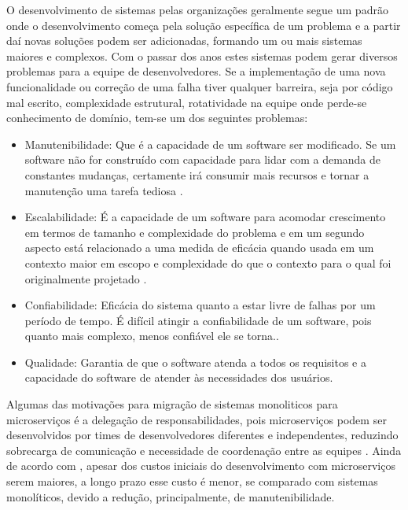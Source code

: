 \documentclass[12pt]{article}
\begin{document}
O desenvolvimento de sistemas pelas organizações geralmente segue um padrão onde o desenvolvimento começa pela solução específica de um problema e a partir daí novas soluções podem ser adicionadas, formando um ou mais sistemas maiores e complexos. Com o passar dos anos estes sistemas podem gerar diversos problemas para a equipe de desenvolvedores. Se a implementação de uma nova funcionalidade ou correção de uma falha tiver qualquer barreira, seja por código mal escrito, complexidade estrutural, rotatividade na equipe onde perde-se conhecimento de domínio, tem-se um dos seguintes problemas:
\begin{itemize}
	\item Manutenibilidade: Que é a capacidade de um software ser modificado. Se um software não for construído com capacidade para lidar com a demanda de constantes mudanças, certamente irá consumir mais recursos e tornar a manutenção uma tarefa tediosa \cite{Velmourougan2014}.
	\item Escalabilidade: É a capacidade de um software para acomodar crescimento em termos de tamanho e complexidade do problema e em um segundo aspecto está relacionado a uma medida de eficácia quando usada em um contexto maior em escopo e complexidade do que o contexto para o qual foi originalmente projetado \cite{Ibrahim2009}.
	\item Confiabilidade: Eficácia do sistema quanto a estar livre de falhas por um período de tempo. É difícil atingir a confiabilidade de um software, pois quanto mais complexo, menos confiável ele se torna.\cite{pan1999}.
	\item Qualidade: Garantia de que o software atenda a todos os requisitos e a capacidade do software de atender às necessidades dos usuários.
\end{itemize}

Algumas das motivações para migração de sistemas monoliticos para microserviços é a delegação de responsabilidades, pois microserviços podem ser desenvolvidos por times de desenvolvedores diferentes e independentes, reduzindo sobrecarga de comunicação e necessidade de coordenação entre as equipes \cite{Taibi}. Ainda de acordo com \cite{Taibi}, apesar dos custos iniciais do desenvolvimento com microserviços serem maiores, a longo prazo esse custo é menor, se comparado com sistemas monolíticos, devido a redução, principalmente, de manutenibilidade. 
\end{document}
